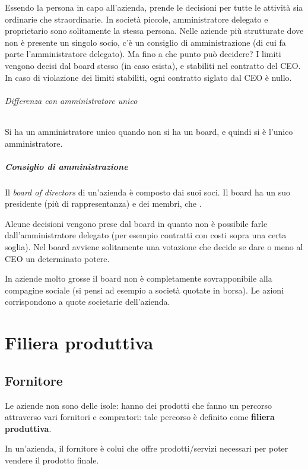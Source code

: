 Essendo la persona in capo all'azienda, prende le decisioni per tutte le
attività sia ordinarie che straordinarie. In società piccole,
amministratore delegato e proprietario sono solitamente la stessa persona. Nelle
aziende più strutturate dove non è presente un singolo socio, c'è un
consiglio di amministrazione (di cui fa parte l'amministratore delegato).
Ma fino a che punto può decidere? I limiti vengono decisi dal board stesso (in
caso esista), e stabiliti nel contratto del CEO. In caso di violazione dei
limiti stabiliti, ogni contratto siglato dal CEO è nullo.

\subparagraph*{Differenza con amministratore unico} Si ha un amministratore
unico quando non si ha un board, e quindi si è l'unico amministratore.

\paragraph*{Consiglio di amministrazione} Il \textit{board of directors} di
un'azienda è composto dai suoi soci. Il board ha un suo presidente (più di
rappresentanza) e dei membri, che .

Alcune decisioni vengono prese dal board in quanto non è possibile farle
dall'amministratore delegato (per esempio contratti con costi sopra una certa
soglia). Nel board avviene solitamente una votazione che decide se dare o meno
al CEO un determinato potere.

In aziende molto grosse il board non è completamente sovrapponibile alla
compagine sociale (si pensi ad esempio a società quotate in borsa). Le azioni
corrispondono a quote societarie dell'azienda.

\chapter{Filiera produttiva}

\section{Fornitore}

Le aziende non sono delle isole: hanno dei prodotti che fanno un percorso
attraverso vari fornitori e compratori: tale percorso è definito come
\textbf{filiera produttiva}.

\begin{definition}[Fornitore]
In un'azienda, il fornitore è colui che offre prodotti/servizi necessari per
poter vendere il prodotto finale.
\end{definition}

